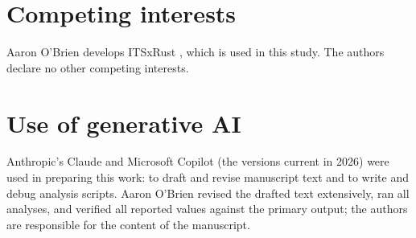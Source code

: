 \documentclass[11pt]{article}
\begin{document}
\section*{Competing interests}
Aaron O'Brien develops ITSxRust \cite{obrien2026itsxrust}, which is used in this study. The authors declare no
other competing interests.

\section*{Use of generative AI}
Anthropic's Claude and Microsoft Copilot (the versions current in 2026) were used in preparing this work: to
draft and revise manuscript text and to write and debug analysis scripts. Aaron O'Brien revised the drafted text
extensively, ran all analyses, and verified all reported values against the primary output; the authors are
responsible for the content of the manuscript.
\end{document}

